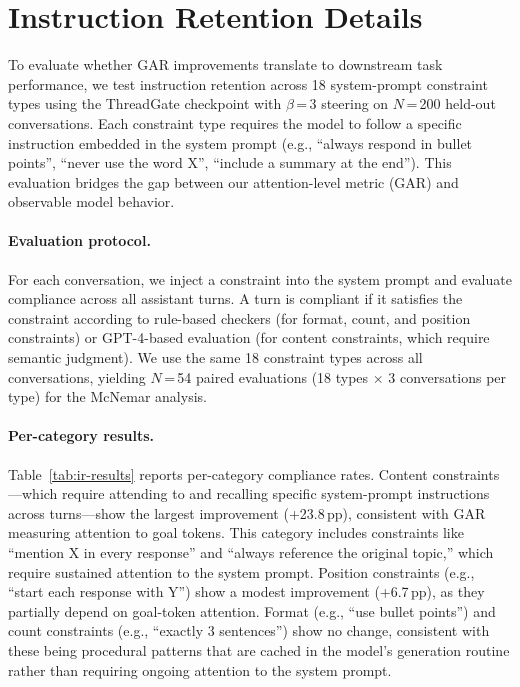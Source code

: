 \section{Instruction Retention Details}\label{sec:appendix-ir}

To evaluate whether GAR improvements translate to downstream task performance, we test instruction retention across 18 system-prompt constraint types using the ThreadGate checkpoint with $\beta$\,=\,3 steering on $N$\,=\,200 held-out conversations. Each constraint type requires the model to follow a specific instruction embedded in the system prompt (e.g., ``always respond in bullet points'', ``never use the word X'', ``include a summary at the end''). This evaluation bridges the gap between our attention-level metric (GAR) and observable model behavior.

\paragraph{Evaluation protocol.} For each conversation, we inject a constraint into the system prompt and evaluate compliance across all assistant turns. A turn is compliant if it satisfies the constraint according to rule-based checkers (for format, count, and position constraints) or GPT-4-based evaluation (for content constraints, which require semantic judgment). We use the same 18 constraint types across all conversations, yielding $N$\,=\,54 paired evaluations (18 types $\times$ 3 conversations per type) for the McNemar analysis.

\paragraph{Per-category results.} Table~\ref{tab:ir-results} reports per-category compliance rates. Content constraints---which require attending to and recalling specific system-prompt instructions across turns---show the largest improvement (+23.8\,pp), consistent with GAR measuring attention to goal tokens. This category includes constraints like ``mention X in every response'' and ``always reference the original topic,'' which require sustained attention to the system prompt. Position constraints (e.g., ``start each response with Y'') show a modest improvement (+6.7\,pp), as they partially depend on goal-token attention. Format (e.g., ``use bullet points'') and count constraints (e.g., ``exactly 3 sentences'') show no change, consistent with these being procedural patterns that are cached in the model's generation routine rather than requiring ongoing attention to the system prompt.

